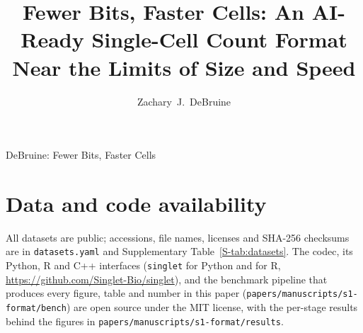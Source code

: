 \documentclass[10pt,journal,compsoc]{IEEEtran}
\begin{document}
\title{Fewer Bits, Faster Cells: An AI-Ready Single-Cell Count Format Near the Limits of Size and Speed}
\author{Zachary~J.~DeBruine%
}

%
{DeBruine: Fewer Bits, Faster Cells}


\maketitle
\IEEEdisplaynontitleabstractindextext
\IEEEpeerreviewmaketitle








\section*{Data and code availability}
All datasets are public; accessions, file names, licenses and SHA-256 checksums are in \texttt{datasets.yaml} and
Supplementary Table~\ref{S-tab:datasets}. The \sone{} codec, its Python, R and C++ interfaces (\texttt{singlet}
 for Python and  for R, \url{https://github.com/Singlet-Bio/singlet}), and the
benchmark pipeline that produces every figure, table and number in this paper
(\texttt{papers/manuscripts/s1-format/bench}) are open source under the MIT license, with the per-stage results behind the
figures in \texttt{papers/manuscripts/s1-format/results}.
\end{document}
